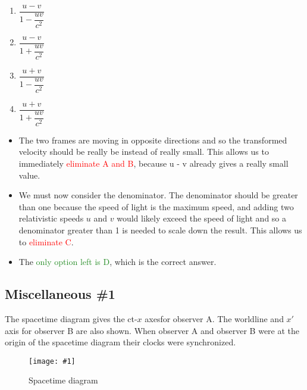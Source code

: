 \documentclass[a4paper,12pt]{article}
\newcommand{\img}[4]{\begin{center}
  \begin{figure}[H]
    \centering
    \texttt{[image: \#1]}
    \caption{#3}
    \label{fig:#4}
  \end{figure}
\end{center}}
\begin{document}
\begin{enumerate}[label=(\Alph*)]
  \item $\dfrac{u - v}{1 - \dfrac{uv}{c^2}}$
  \item $\dfrac{u - v}{1 + \dfrac{uv}{c^2}}$
  \item $\dfrac{u + v}{1 - \dfrac{uv}{c^2}}$
  \item $\dfrac{u + v}{1 + \dfrac{uv}{c^2}}$
\end{enumerate}

\begin{itemize}
  \item The two frames are moving in opposite directions and so the transformed velocity should be really be instead of really small. This allows us to immediately \textcolor{red}{eliminate A and B}, because u - v already gives a really small value.
  \item We must now consider the denominator. The denominator should be greater than one because the speed of light is the maximum speed, and adding two relativistic speeds $u$ and $v$ would likely exceed the speed of light and so a denominator greater than 1 is needed to scale down the result. This allows us to \textcolor{red}{eliminate C}.
  \item The \textcolor{ForestGreen}{only option left is D}, which is the correct answer.
\end{itemize}

\pagebreak

\subsection{Miscellaneous \#1}
The spacetime diagram gives the ct-$x$ axesfor observer A. The worldline and $x'$ axis for observer B are also shown. When observer A and observer B were at the
origin of the spacetime diagram their clocks were synchronized.

\img{ex/1.png}{0.95}{Spacetime diagram}{misc1}
\end{document}
